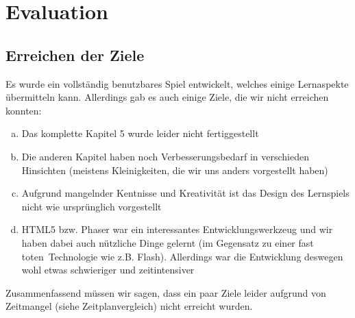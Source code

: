 \documentclass[a4paper]{article}
\begin{document}
\section{Evaluation}
    \subsection{Erreichen der Ziele}
        Es wurde ein vollständig benutzbares Spiel entwickelt, welches einige Lernaspekte übermitteln kann. Allerdings gab es auch einige Ziele, die wir nicht erreichen konnten:
        \begin{enumerate}[(a)]
            \item Das komplette Kapitel 5 wurde leider nicht fertiggestellt
            \item Die anderen Kapitel haben noch Verbesserungsbedarf in verschieden Hinsichten (meistens Kleinigkeiten, die wir uns anders vorgestellt haben)
            \item Aufgrund mangelnder Kentnisse und Kreativität ist das Design des Lernspiels nicht wie ursprünglich vorgestellt
            \item HTML5 bzw. Phaser war ein interessantes Entwicklungswerkzeug und wir haben dabei auch nützliche Dinge gelernt (im Gegensatz zu einer fast \glqq toten\grqq\ Technologie wie z.B. Flash). Allerdings war die Entwicklung deswegen wohl etwas schwieriger und zeitintensiver
        \end{enumerate}
        Zusammenfassend müssen wir sagen, dass ein paar Ziele leider aufgrund von Zeitmangel (siehe Zeitplanvergleich) nicht erreicht wurden.

    \pagebreak
\end{document}
